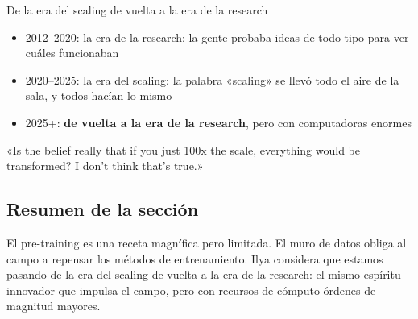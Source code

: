 \begin{importantbox}{De la era del scaling de vuelta a la era de la research}
\begin{itemize}
    \item 2012--2020: la era de la research: la gente probaba ideas de todo tipo para ver cuáles funcionaban
    \item 2020--2025: la era del scaling: la palabra «scaling» se llevó todo el aire de la sala, y todos hacían lo mismo
    \item 2025+: \textbf{de vuelta a la era de la research}, pero con computadoras enormes
\end{itemize}
«Is the belief really that if you just 100x the scale, everything would be transformed? I don't think that's true.»
\end{importantbox}

\subsection{Resumen de la sección}

El pre-training es una receta magnífica pero limitada. El muro de datos obliga al campo a repensar los métodos de entrenamiento. Ilya considera que estamos pasando de la era del scaling de vuelta a la era de la research: el mismo espíritu innovador que impulsa el campo, pero con recursos de cómputo órdenes de magnitud mayores.
